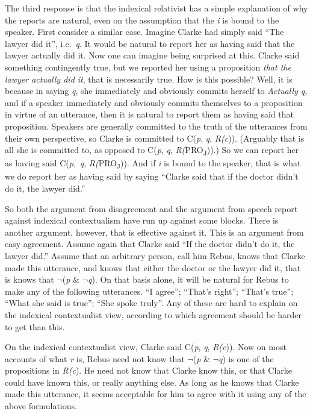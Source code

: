 \documentclass[
  11pt,
  letterpaper,
  DIV=11,
  numbers=noendperiod,
  oneside]{scrartcl}
\begin{document}
The third response is that the indexical relativist has a simple
explanation of why the reports are natural, even on the assumption that
the \emph{i} is bound to the speaker. First consider a similar case.
Imagine Clarke had simply said ``The lawyer did it'', i.e.~\emph{q}. It
would be natural to report her as having said that the lawyer actually
did it. Now one can imagine being surprised at this. Clarke said
something contingently true, but we reported her using a proposition
\emph{that the lawyer actually did it}, that is necessarily true. How is
this possible? Well, it is because in saying \emph{q}, she immediately
and obviously commits herself to \emph{Actually q}, and if a speaker
immediately and obviously commits themselves to a proposition in virtue
of an utterance, then it is natural to report them as having said that
proposition. Speakers are generally committed to the truth of the
utterances from their own perspective, so Clarke is committed to
C(\emph{p}, \emph{q}, \emph{R(c})). (Arguably that is all she is
committed to, as opposed to C(\emph{p}, \emph{q},
\emph{R(}PRO\textsubscript{J})).) So we can report her as having said
C(\emph{p},~\emph{q}, \emph{R(}PRO\textsubscript{J})). And if \emph{i}
is bound to the speaker, that is what we do report her as having said by
saying ``Clarke said that if the doctor didn't do it, the lawyer
did.''

So both the argument from disagreement and the argument from speech
report against indexical contextualism have run up against some blocks.
There is another argument, however, that is effective against it. This
is an argument from easy agreement. Assume again that Clarke said ``If
the doctor didn't do it, the lawyer did.'' Assume that an arbitrary
person, call him Rebus, knows that Clarke made this utterance, and knows
that either the doctor or the lawyer did it, that is knows that
\(\neg\)(\emph{p} \& \(\neg\)\emph{q}). On that basis alone, it will be
natural for Rebus to make any of the following utterances. ``I agree'';
``That's right''; ``That's true''; ``What she said is true''; ``She
spoke truly''. Any of these are hard to explain on the indexical
contextualist view, according to which agreement should be harder to get
than this.

On the indexical contextualist view, Clarke said C(\emph{p}, \emph{q},
\emph{R(c})). Now on most accounts of what \emph{r} is, Rebus need not
know that \(\neg\)(\emph{p} \& \(\neg\)\emph{q}) is one of the
propositions in \emph{R(c}). He need not know that Clarke know this, or
that Clarke could have known this, or really anything else. As long as
he knows that Clarke made this utterance, it seems acceptable for him to
agree with it using any of the above formulations.
\end{document}
